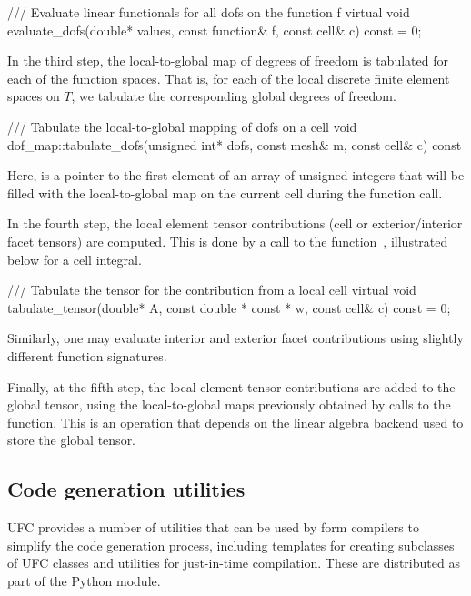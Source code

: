 {\scriptsize
\begin{code}
/// Evaluate linear functionals for all dofs on the function f
virtual void evaluate_dofs(double* values,
                           const function& f,
                           const cell& c) const = 0;
\end{code}
}

In the third step, the local-to-global map of degrees of freedom is
tabulated for each of the function spaces. That is, for each of the
local discrete finite element spaces on $T$, we tabulate the
corresponding global degrees of freedom.

{\scriptsize
\begin{code}
/// Tabulate the local-to-global mapping of dofs on a cell
void dof_map::tabulate_dofs(unsigned int* dofs,
                            const mesh& m,
                            const cell& c) const
\end{code}
}
Here,  is a pointer to the first element of an
array of unsigned integers that will be filled with the
local-to-global map on the current cell during the function call.

In the fourth step, the local element tensor contributions (cell or
exterior/interior facet tensors) are computed. This is done by a call
to the function~, illustrated below for a
cell integral.
{\scriptsize
\begin{code}
/// Tabulate the tensor for the contribution from a local cell
virtual void tabulate_tensor(double* A,
                             const double * const * w,
                             const cell& c) const = 0;
\end{code}
}
Similarly, one may evaluate interior and exterior facet contributions
using slightly different function signatures.

Finally, at the fifth step, the local element tensor contributions are
added to the global tensor, using the local-to-global maps previously
obtained by calls to the  function. This is an
operation that depends on the linear algebra backend used to store the
global tensor.

\subsection{Code generation utilities}

UFC provides a number of utilities that can be used by form compilers
to simplify the code generation process, including templates for
creating subclasses of UFC classes and utilities for just-in-time
compilation.  These are distributed as part of the 
Python module.

